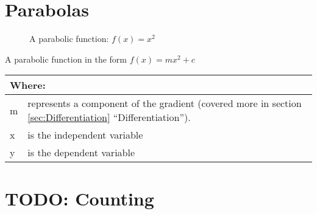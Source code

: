 \section{Parabolas}
\label{sec:Parabolas}
\begin{figure}[!hbt]
\label{fig:FuncGraphParabola}
\caption{A parabolic function: $f(x) = {x}^{2}$}
\end{figure}
A parabolic function in the form $ f(x) = mx^2 + c$
\begin{table}[!hbt]
\label{tab:PartsOfAParabolicFunction}
\begin{tabularx}{\linewidth}{| l X |}
  \hline
  \multicolumn{2}{|l|}{Where:} \\
  \hline \hline
  m & represents a component of the gradient (covered more in section
  \ref{sec:Differentiation} ``Differentiation''). \\ x & is the independent
  variable\\ y & is the dependent variable\\
\hline
\end{tabularx}
\end{table}
%
%
\newpage
\section{TODO: Counting}
\label{sec:Counting}
\newpage
